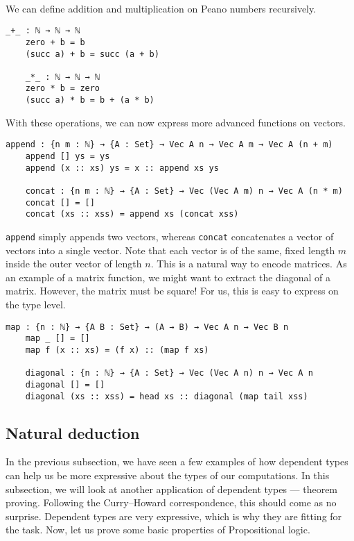 \documentclass[12pt]{article}
\begin{document}
\paragraph{}
We can define addition and multiplication on Peano numbers recursively.
\begin{Verbatim}[samepage=true]
    _+_ : ℕ → ℕ → ℕ
    zero + b = b
    (succ a) + b = succ (a + b)

    _*_ : ℕ → ℕ → ℕ
    zero * b = zero
    (succ a) * b = b + (a * b)
\end{Verbatim}
With these operations, we can now express more advanced functions on vectors.
\begin{Verbatim}[samepage=true]
    append : {n m : ℕ} → {A : Set} → Vec A n → Vec A m → Vec A (n + m)
    append [] ys = ys
    append (x :: xs) ys = x :: append xs ys

    concat : {n m : ℕ} → {A : Set} → Vec (Vec A m) n → Vec A (n * m)
    concat [] = []
    concat (xs :: xss) = append xs (concat xss)
\end{Verbatim}
\verb|append| simply appends two vectors, whereas \verb|concat| concatenates a vector of vectors into a single vector. Note that each vector is of the same, fixed length $m$ inside the outer vector of length $n$. This is a natural way to encode matrices. As an example of a matrix function, we might want to extract the diagonal of a matrix. However, the matrix must be square! For us, this is easy to express on the type level.
\begin{Verbatim}[samepage=true]
    map : {n : ℕ} → {A B : Set} → (A → B) → Vec A n → Vec B n
    map _ [] = []
    map f (x :: xs) = (f x) :: (map f xs)

    diagonal : {n : ℕ} → {A : Set} → Vec (Vec A n) n → Vec A n
    diagonal [] = []
    diagonal (xs :: xss) = head xs :: diagonal (map tail xss)
\end{Verbatim}


\subsection{Natural deduction}
In the previous subsection, we have seen a few examples of how dependent types can help us be more expressive about the types of our computations. In this subsection, we will look at another application of dependent types — theorem proving. Following the Curry–Howard correspondence, this should come as no surprise. Dependent types are very expressive, which is why they are fitting for the task. Now, let us prove some basic properties of Propositional logic.
\end{document}
